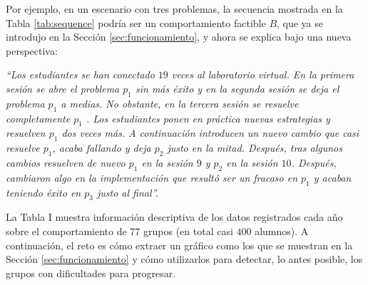 Por ejemplo, en un escenario con tres problemas, la secuencia mostrada en la Tabla \ref{tab:sequence} podría ser un comportamiento factible $B$, que ya se introdujo en la Sección \ref{sec:funcionamiento}, y ahora se explica bajo una nueva perspectiva:

\emph{``Los estudiantes se han conectado $19$ veces al laboratorio virtual. En la primera sesión se abre el problema $p_1$ sin más éxito y en la segunda sesión se deja el problema $p_1$ a medias. No obstante, en la tercera sesión se resuelve completamente $p_1$ . Los estudiantes ponen en práctica nuevas estrategias y resuelven $p_1$ dos veces más. A continuación introducen un nuevo cambio que casi resuelve $p_1$, acaba fallando y deja $p_2$ justo en la mitad. Después, tras algunos cambios resuelven de nuevo $p_1$ en la sesión $9$ y $p_2$ en la sesión $10$. Después, cambiaron algo en la implementación que resultó ser un fracaso en $p_1$ y acaban teniendo éxito en $p_3$ justo al final''.}

La Tabla I muestra información descriptiva de los datos registrados cada año sobre el comportamiento de $77$ grupos (en total casi $400$ alumnos). A continuación, el reto es cómo extraer un gráfico como los que se muestran en la Sección \ref{sec:funcionamiento} y cómo utilizarlos para detectar, lo antes posible, los grupos con dificultades para progresar.